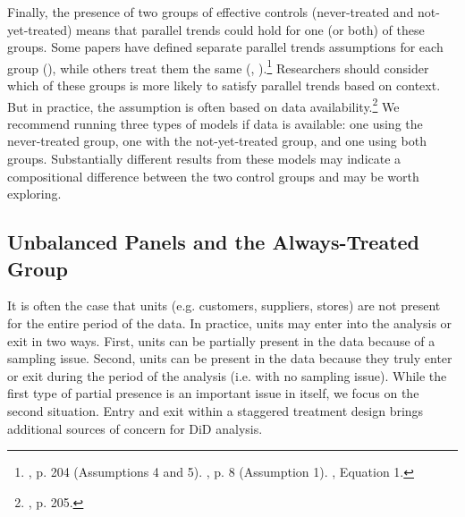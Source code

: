 \documentclass[12pt]{article}
\begin{document}
Finally, the presence of two groups of effective controls (never-treated and not-yet-treated) means that parallel trends could hold for one (or both) of these groups. Some papers have defined separate parallel trends assumptions for each group (\citet{CS2021}), while others treat them the same (\citet{borusyak2024revisiting}, \citet{gardner2022a}).\footnote{\citet{CS2021}, p. 204 (Assumptions 4 and 5). \citet{borusyak2024revisiting}, p. 8 (Assumption 1). \citet{gardner2022a}, Equation 1.}  Researchers should consider which of these groups is more likely to satisfy parallel trends based on context. But in practice, the assumption is often based on data availability.\footnote{\citet{CS2021}, p. 205.}  We recommend running three types of models if data is available: one using the never-treated group, one with the not-yet-treated group, and one using both groups. Substantially different results from these models may indicate a compositional difference between the two control groups and may be worth exploring.

\subsection{Unbalanced Panels and the Always-Treated Group}
It is often the case that units (e.g. customers, suppliers, stores) are not present for the entire period of the data. In practice, units may enter into the analysis or exit in two ways. First, units can be partially present in the data because of a sampling issue. Second, units can be present in the data because they truly enter or exit during the period of the analysis (i.e. with no sampling issue). While the first type of partial presence is an important issue in itself, we focus on the second situation. Entry and exit within a staggered treatment design brings additional sources of concern for DiD analysis.
\end{document}

